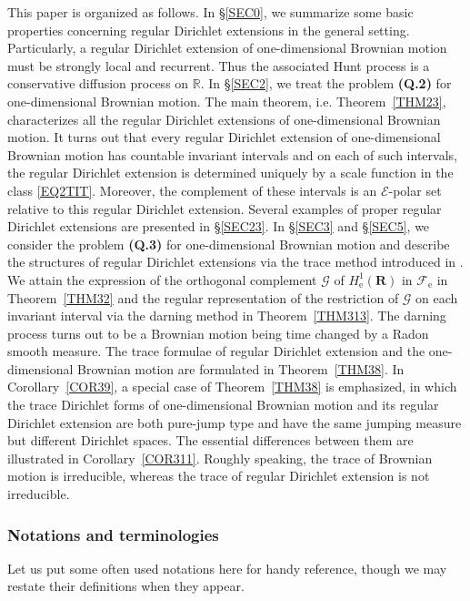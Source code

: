 \documentclass[a4paper]{amsart}
\theoremstyle{definition}
\theoremstyle{remark}
\numberwithin{equation}{section}
\begin{document}
This paper is organized as follows. In \S\ref{SEC0}, we summarize some basic properties concerning regular Dirichlet extensions in the general setting. Particularly, a regular Dirichlet extension of one-dimensional Brownian motion must be strongly local and recurrent. Thus the associated Hunt process is a conservative diffusion process on $\mathbb{R}$. In \S\ref{SEC2}, we treat the problem \textbf{(Q.2)} for one-dimensional Brownian motion. The main theorem, i.e. Theorem~\ref{THM23}, characterizes all the regular Dirichlet extensions of one-dimensional Brownian motion. It turns out that every regular Dirichlet extension of one-dimensional Brownian motion has countable invariant intervals and on each of such intervals, the regular Dirichlet extension is determined uniquely by a scale function in the class \eqref{EQ2TIT}. Moreover, the complement of these intervals is an ${{\mathcal{E}}}$-polar set relative to this regular Dirichlet extension. Several examples of proper regular Dirichlet extensions are presented in \S\ref{SEC23}.  In \S\ref{SEC3} and \S\ref{SEC5}, we consider the problem \textbf{(Q.3)} for one-dimensional Brownian motion and describe the structures of regular Dirichlet extensions via the trace method introduced in \cite{LY14}. We attain the expression of the orthogonal complement $\mathcal{G}$ of $H^1_\mathrm{e}(\mathbf{R})$ in ${{\mathcal{F}}}_\mathrm{e}$ in Theorem~\ref{THM32} and the regular representation of the restriction of $\mathcal{G}$ on each invariant interval via the darning method in Theorem~\ref{THM313}. The darning process turns out to be a Brownian motion being time changed by a Radon smooth measure. The trace formulae of regular Dirichlet extension and the one-dimensional Brownian motion are formulated in Theorem~\ref{THM38}. In Corollary~\ref{COR39}, a special case of Theorem~\ref{THM38} is emphasized, in which the trace Dirichlet forms of one-dimensional Brownian motion and its regular Dirichlet extension are both pure-jump type and have the same jumping measure but different Dirichlet spaces. The essential differences between them are illustrated in Corollary~\ref{COR311}. Roughly speaking, the trace of Brownian motion is irreducible, whereas the trace of regular Dirichlet extension is not irreducible.

\subsubsection*{Notations and terminologies}
Let us put some often used notations here for handy reference, though we may restate their definitions when they appear.
\end{document}
